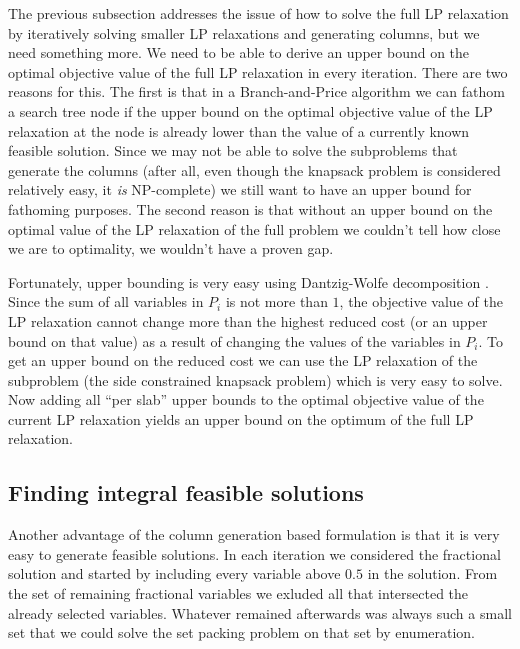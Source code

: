 The previous subsection addresses the issue of how to solve the full LP
relaxation by iteratively solving smaller LP relaxations and generating
columns, but we need something more. We need to be able to derive an upper
bound on the optimal objective value of the full LP relaxation in every
iteration. There are two reasons for this. The first is that in a
Branch-and-Price algorithm we can fathom a search tree node if the upper bound
on the optimal objective value of the LP relaxation at the node is already
lower than the value of a currently known feasible solution. Since we may not
be able to solve the subproblems that generate the columns (after all, even
though the knapsack problem is considered relatively easy, it {\em is}
NP-complete) we still want to have an upper bound for fathoming purposes. The
second reason is that without an upper bound on the optimal value of the LP
relaxation of the full problem we couldn't tell how close we are to
optimality, we wouldn't have a proven gap.

Fortunately, upper bounding is very easy using Dantzig-Wolfe decomposition
\cite{dantzig-wolfe}. Since the sum of all variables in $P_i$ is not more than
$1$, the objective value of the LP relaxation cannot change more than the
highest reduced cost (or an upper bound on that value) as a result of changing
the values of the variables in $P_i$. To get an upper bound on the reduced
cost we can use the LP relaxation of the subproblem (the side constrained
knapsack problem) which is very easy to solve. Now adding all ``per slab''
upper bounds to the optimal objective value of the current LP relaxation
yields an upper bound on the optimum of the full LP relaxation.

\subsection{Finding integral feasible solutions}

Another advantage of the column generation based formulation is that it is
very easy to generate feasible solutions. In each iteration we considered the
fractional solution and started by including every variable above $0.5$ in the
solution. From the set of remaining fractional variables we exluded all that
intersected the already selected variables. Whatever remained afterwards was
always such a small set that we could solve the set packing problem on that
set by enumeration.


